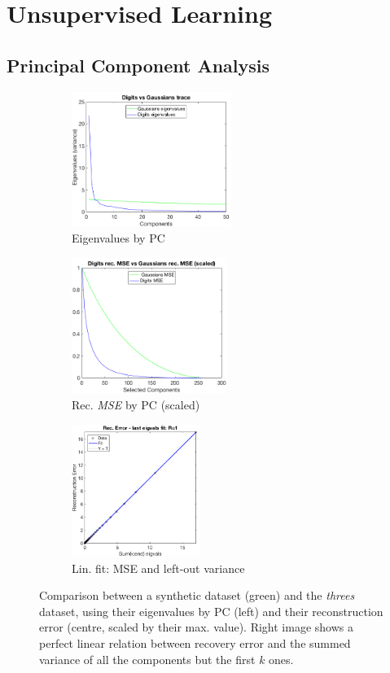 \documentclass[a4paper, 10pt]{article}
\begin{document}
  \newpage
\section{Unsupervised Learning}
  \subsection{Principal Component Analysis}
  \begin{figure}[h]
    \begin{adjustwidth}{-1cm}{-1cm}
    \centering
    \begin{subfigure}[t]{0.3\linewidth}
      \includegraphics[width=1\linewidth, height=4.4cm]{./lab3/PCA/digits_vs_random_trace.png}
      \caption{Eigenvalues by PC}
      \label{fig:l3_traces}
    \end{subfigure}
    \begin{subfigure}[t]{0.29\linewidth}
      \includegraphics[width=1\linewidth, height=4.4cm]{./lab3/PCA/digits_vs_random_recMSE.png}
      \caption{Rec. \emph{MSE} by PC (scaled)}
      \label{fig:l3_rec_MSE}
    \end{subfigure}
    \begin{subfigure}[t]{0.3\linewidth}
      \includegraphics[width=1\linewidth, height=4.3cm]{./lab3/PCA/regression.png}
      \caption{Lin. fit: MSE and left-out variance}
      \label{fig:l3_regression}
    \end{subfigure}
    \end{adjustwidth}
    \caption{Comparison between a synthetic dataset (green) and the 
      \emph{threes} dataset, using their eigenvalues by PC (left) and their
      reconstruction error (centre, scaled by their max. value).
      Right image shows a perfect linear relation between recovery error and
      the summed variance of all the components but the first $k$ ones.}
    \label{fig:l3_first_task}
  \end{figure}
\end{document}
